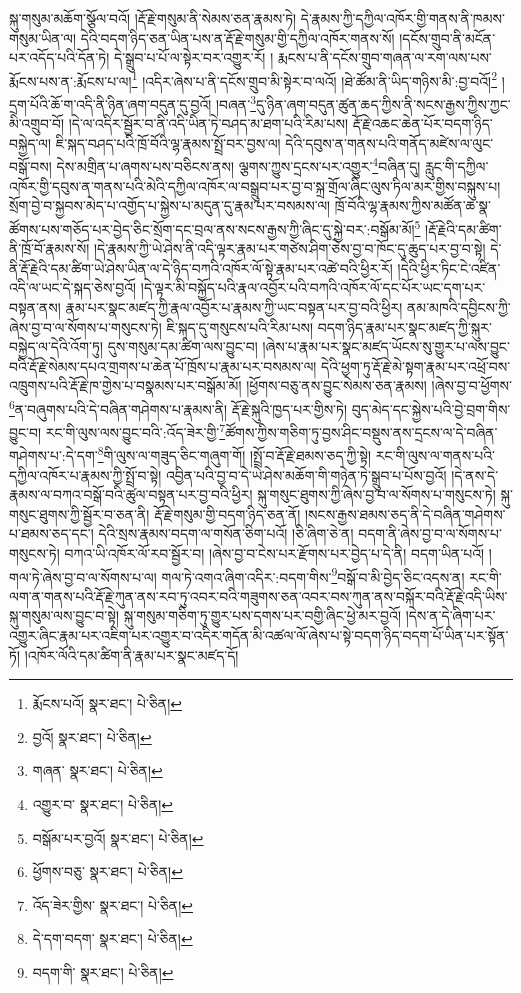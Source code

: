 སྐུ་གསུམ་མཆོག་སྩོལ་བའོ། །རྡོ་རྗེ་གསུམ་ནི་སེམས་ཅན་རྣམས་ཏེ། དེ་རྣམས་ཀྱི་དཀྱིལ་འཁོར་གྱི་གནས་ནི་ཁམས་གསུམ་ཡིན་ལ། དེའི་བདག་ཉིད་ཅན་ཡིན་པས་ན་རྡོ་རྗེ་གསུམ་གྱི་དཀྱིལ་འཁོར་གནས་སོ། །དངོས་གྲུབ་ནི་མངོན་པར་འདོད་པའི་དོན་ཏེ། དེ་སྒྲུབ་པ་པོ་ལ་སྟེར་བར་འགྱུར་རོ། །
རྨངས་པ་ནི་དངོས་གྲུབ་གཞན་ལ་རག་ལས་པས་རྨོངས་པས་ན་:རྨོངས་པ་ལ།\footnote{རྨོངས་པའོ།  སྣར་ཐང་།  པེ་ཅིན། } །འདིར་ཞེས་པ་ནི་དངོས་གྲུབ་མི་སྟེར་བ་ལའོ། །ཐེ་ཚོམ་ནི་ཡིད་གཉིས་མི་:བྱ་བའོ།\footnote{བྱའོ།  སྣར་ཐང་།  པེ་ཅིན། } །དྲག་པོའི་ཆོ་ག་འདི་ནི་ཉིན་ཞག་བདུན་དུ་བྱའོ། །བཞན་\footnote{གཞན་  སྣར་ཐང་།  པེ་ཅིན། }དུ་ཉིན་ཞག་བདུན་ཚུན་ཆད་ཀྱིས་ནི་སངས་རྒྱས་ཀྱིས་ཀྱང་མི་འགྲུབ་བོ། །དེ་ལ་འདིར་སྦྱོར་བ་ནི་འདི་ཡིན་ཏེ་བཤད་མ་ཐག་པའི་རིམ་པས། རྡོ་རྗེ་འཆང་ཆེན་པོར་བདག་ཉིད་བསྐྱེད་ལ། ཇི་སྐད་བཤད་པའི་ཁྲོ་བོའི་ལྷ་རྣམས་སྤྲོ་བར་བྱས་ལ། དེའི་དབུས་ན་གནས་པའི་གནོད་མཛེས་ལ་ལུང་བསྒོ་བས། དེས་མགྲིན་པ་ཞགས་པས་བཅིངས་ནས། ལྕགས་ཀྱུས་དྲངས་པར་འགྱུར་\footnote{འགྱུར་བ་  སྣར་ཐང་།  པེ་ཅིན། }བཞིན་དུ། རླུང་གི་དཀྱིལ་འཁོར་གྱི་དབུས་ན་གནས་པའི་མེའི་དཀྱིལ་འཁོར་ལ་བསྒྲུབ་པར་བྱ་བ་སྐྲ་གྲོལ་ཞིང་ལུས་ཏིལ་མར་གྱིས་བསྐུས་པ། སྲོག་བྱེ་བ་སྐྱབས་མེད་པ་འགྱོད་པ་སྐྱེས་པ་མདུན་དུ་རྣམ་པར་བསམས་ལ། ཁྲོ་བོའི་ལྷ་རྣམས་ཀྱིས་མཚོན་ཆ་སྣ་ཚོགས་པས་གཅོད་པར་བྱེད་ཅིང་སྲོག་དང་བྲལ་ནས་སངས་རྒྱས་ཀྱི་ཞིང་དུ་སྐྱེ་བར་:བསྒོམ་མོ།\footnote{བསྒོམ་པར་བྱའོ།  སྣར་ཐང་།  པེ་ཅིན། } །རྡོ་རྗེའི་དམ་ཚིག་ནི་ཁྲོ་བོ་རྣམས་སོ། །དེ་རྣམས་ཀྱི་ཡེ་ཤེས་ནི་འདི་ལྟར་རྣམ་པར་གཙེས་ཤིག་ཅེས་བྱ་བ་ཁོང་དུ་ཆུད་པར་བྱ་བ་སྟེ། དེ་ནི་རྡོ་རྗེའི་དམ་ཚིག་ཡེ་ཤེས་ཡིན་ལ་དེ་ཉིད་བཀའི་འཁོར་ལོ་སྟེ་རྣམ་པར་འཚེ་བའི་ཕྱིར་རོ། །དེའི་ཕྱིར་ཏིང་ངེ་འཛིན་འདི་ལ་ཡང་དེ་སྐད་ཅེས་བྱའོ། །དེ་ལྟར་མི་བསྐྱོད་པའི་རྣལ་འབྱོར་པའི་བཀའི་འཁོར་ལོ་དང་པོར་ཡང་དག་པར་བསྟན་ནས། རྣམ་པར་སྣང་མཛད་ཀྱི་རྣལ་འབྱོར་པ་རྣམས་ཀྱི་ཡང་བསྟན་པར་བྱ་བའི་ཕྱིར། ནམ་མཁའི་དབྱིངས་ཀྱི་ཞེས་བྱ་བ་ལ་སོགས་པ་གསུངས་ཏེ། ཇི་སྐད་དུ་གསུངས་པའི་རིམ་པས། བདག་ཉིད་རྣམ་པར་སྣང་མཛད་ཀྱི་སྐུར་བསྐྱེད་ལ་དེའི་འོག་ཏུ། དུས་གསུམ་དམ་ཚིག་ལས་བྱུང་བ། །ཞེས་པ་རྣམ་པར་སྣང་མཛད་ཡོངས་སུ་གྱུར་པ་ལས་བྱུང་བའི་རྡོ་རྗེ་སེམས་དཔའ་གྲགས་པ་ཆེན་པོ་ཁྲོས་པ་རྣམ་པར་བསམས་ལ། དེའི་ཕྱག་ཏུ་རྡོ་རྗེ་མེ་སྟག་རྣམ་པར་འཕྲོ་བས་འཁྲུགས་པའི་རྡོ་རྗེ་ཁ་གྱེས་པ་བསྣམས་པར་བསྒོམ་མོ། །ཕྱོགས་བཅུ་ནས་བྱུང་སེམས་ཅན་རྣམས། །ཞེས་བྱ་བ་ཕྱོགས་\footnote{ཕྱོགས་བཅུ་  སྣར་ཐང་།  པེ་ཅིན། }ན་བཞུགས་པའི་དེ་བཞིན་གཤེགས་པ་རྣམས་ནི། རྡོ་རྗེ་སྐུའི་ཁྱད་པར་གྱིས་ཏེ། བུད་མེད་དང་སྐྱེས་པའི་བྱེ་བྲག་གིས་བྱུང་བ། རང་གི་ལུས་ལས་བྱུང་བའི་:འོད་ཟེར་གྱི་\footnote{འོད་ཟེར་གྱིས་  སྣར་ཐང་།  པེ་ཅིན། }ཚོགས་ཀྱིས་གཅིག་ཏུ་བྱས་ཤིང་བསྡུས་ནས་དྲངས་ལ་དེ་བཞིན་གཤེགས་པ་:དེ་དག་\footnote{དེ་དག་བདག་  སྣར་ཐང་།  པེ་ཅིན། }གི་ལུས་ལ་གཟུད་ཅིང་གཞུག་གོ། །སྤྲོ་བ་རྡོ་རྗེ་ཐམས་ཅད་ཀྱི་སྟེ། རང་གི་ལུས་ལ་གནས་པའི་དཀྱིལ་འཁོར་པ་རྣམས་ཀྱི་སྤྲོ་བ་སྟེ། འབྱིན་པའི་བྱ་བ་དེ་ཡེ་ཤེས་མཆོག་གི་གཉེན་ཏེ་སྒྲུབ་པ་པོས་བྱའོ། །དེ་ནས་དེ་རྣམས་ལ་བཀའ་བསྒོ་བའི་ཚུལ་བསྟན་པར་བྱ་བའི་ཕྱིར། སྐུ་གསུང་ཐུགས་ཀྱི་ཞེས་བྱ་བ་ལ་སོགས་པ་གསུངས་ཏེ། སྐུ་གསུང་ཐུགས་ཀྱི་སྦྱོར་བ་ཅན་ནི། རྡོ་རྗེ་གསུམ་གྱི་བདག་ཉིད་ཅན་ནོ། །སངས་རྒྱས་ཐམས་ཅད་ནི་དེ་བཞིན་གཤེགས་པ་ཐམས་ཅད་དང་། དེའི་སྲས་རྣམས་བདག་ལ་གསོན་ཅིག་པའོ། །ཅི་ཞིག་ཅེ་ན། བདག་ནི་ཞེས་བྱ་བ་ལ་སོགས་པ་གསུངས་ཏེ། བཀའ་ཡི་འཁོར་ལོ་རབ་སྦྱོར་བ། །ཞེས་བྱ་བ་ངེས་པར་རྫོགས་པར་བྱེད་པ་དེ་ནི། བདག་ཡིན་པའོ། །གལ་ཏེ་ཞེས་བྱ་བ་ལ་སོགས་པ་ལ། གལ་ཏེ་འགའ་ཞིག་འདིར་:བདག་གིས་\footnote{བདག་གི་  སྣར་ཐང་།  པེ་ཅིན། }བསྒོ་བ་མི་བྱེད་ཅིང་འདས་ན། རང་གི་ལག་ན་གནས་པའི་རྡོ་རྗེ་ཀུན་ནས་རབ་ཏུ་འབར་བའི་གཟུགས་ཅན་འབར་བས་ཀུན་ནས་བསྐོར་བའི་རྡོ་རྗེ་འདི་ཡིས་སྐུ་གསུམ་ལས་བྱུང་བ་སྟེ། སྐུ་གསུམ་གཅིག་ཏུ་གྱུར་པས་དགས་པར་བགྱི་ཞིང་ཕྱེ་མར་བྱའོ། །དེས་ན་དེ་ཞིག་པར་འགྱུར་ཞིང་རྣམ་པར་འཇིག་པར་འགྱུར་བ་འདིར་གདོན་མི་འཚལ་ལོ་ཞེས་པ་སྟེ་བདག་ཉིད་བདག་པོ་ཡིན་པར་སྟོན་ཏོ། །འཁོར་ལོའི་དམ་ཚིག་ནི་རྣམ་པར་སྣང་མཛད་དོ། 